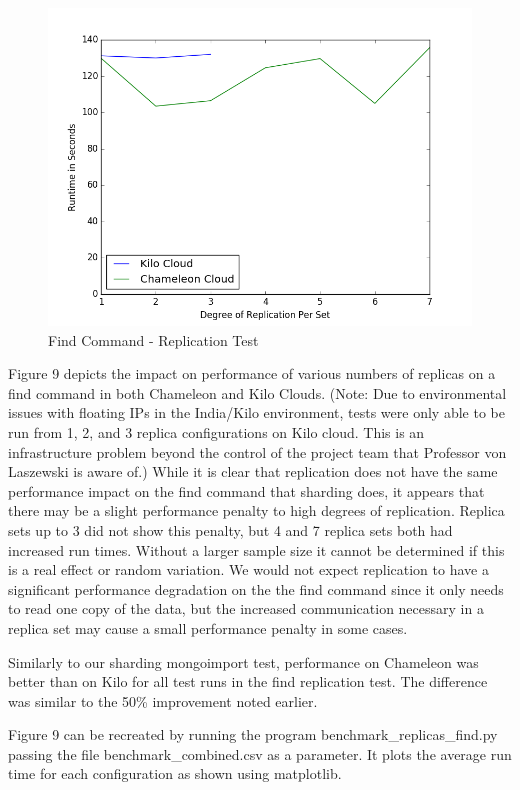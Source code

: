 \documentclass[9pt,twocolumn,twoside]{styles/osajnl}
\begin{document}
\begin{figure}[!ht]
  \includegraphics[scale=0.45]{images/replica_find.png}
  \caption{Find Command - Replication Test}
\end{figure}


Figure 9 depicts the impact on performance of various numbers of replicas on a find command in both Chameleon and Kilo Clouds.  (Note: Due to environmental issues with floating IPs in the India/Kilo environment, tests were only able to be run from 1, 2, and 3 replica configurations on Kilo cloud.  This is an infrastructure problem beyond the control of the project team that Professor von Laszewski is aware of.)  While it is clear that replication does not have the same performance impact on the find command that sharding does, it appears that there may be a slight performance penalty to high degrees of replication.  Replica sets up to 3 did not show this penalty, but 4 and 7 replica sets both had increased run times.  Without a larger sample size it cannot be determined if this is a real effect or random variation.  We would not expect replication to have a significant performance degradation on the the find command since it only needs to read one copy of the data, but the increased communication necessary in a replica set may cause a small performance penalty in some cases.

Similarly to our sharding mongoimport test, performance on Chameleon was better than on Kilo for all test runs in the find replication test.  The difference was similar to the 50\% improvement noted earlier.

Figure 9 can be recreated by running the program benchmark\_replicas\_find.py passing the file benchmark\_combined.csv as a parameter.  It plots the average run time for each configuration as shown using matplotlib.
\end{document}
